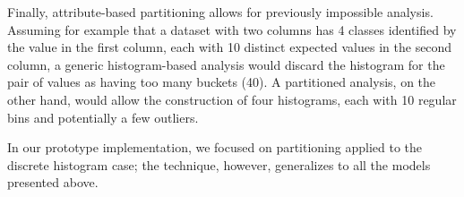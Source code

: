 Finally, attribute-based partitioning allows for previously impossible analysis. Assuming for example that a dataset with two columns has 4 classes identified by the value in the first column, each with 10 distinct expected values in the second column, a generic histogram-based analysis would discard the histogram for the pair of values as having too many buckets (40). A partitioned analysis, on the other hand, would allow the construction of four histograms, each with 10 regular bins and potentially a few outliers.

In our prototype implementation, we focused on partitioning applied to the discrete histogram case; the technique, however, generalizes to all the models presented above.
